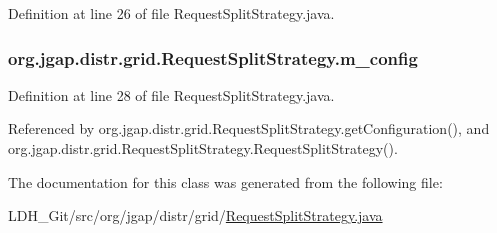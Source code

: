 Definition at line 26 of file Request\-Split\-Strategy.\-java.

\hypertarget{classorg_1_1jgap_1_1distr_1_1grid_1_1_request_split_strategy_a7ffc74dafef4bae5dc69e3f343ca553b}{
\subsubsection[{m\-\_\-config}]{ org.\-jgap.\-distr.\-grid.\-Request\-Split\-Strategy.\-m\-\_\-config\hspace{0.3cm}{\ttfamily [private]}}}\label{classorg_1_1jgap_1_1distr_1_1grid_1_1_request_split_strategy_a7ffc74dafef4bae5dc69e3f343ca553b}


Definition at line 28 of file Request\-Split\-Strategy.\-java.



Referenced by org.\-jgap.\-distr.\-grid.\-Request\-Split\-Strategy.\-get\-Configuration(), and org.\-jgap.\-distr.\-grid.\-Request\-Split\-Strategy.\-Request\-Split\-Strategy().



The documentation for this class was generated from the following file\-:\begin{DoxyCompactItemize}
\item 
L\-D\-H\-\_\-\-Git/src/org/jgap/distr/grid/\hyperlink{_request_split_strategy_8java}{Request\-Split\-Strategy.\-java}\end{DoxyCompactItemize}
